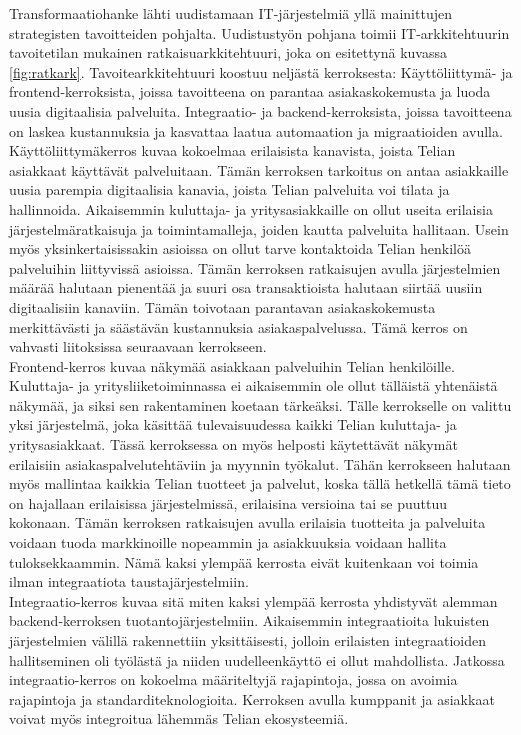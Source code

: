 \documentclass[finnish,12pt,a4paper,pdftex]{article}
\begin{document}
Transformaatiohanke lähti uudistamaan IT-järjestelmiä yllä mainittujen strategisten tavoitteiden pohjalta. Uudistustyön pohjana toimii IT-arkkitehtuurin tavoitetilan mukainen ratkaisuarkkitehtuuri, joka on esitettynä kuvassa \ref{fig:ratkark}. Tavoitearkkitehtuuri koostuu neljästä kerroksesta: Käyttöliittymä- ja frontend-kerroksista, joissa tavoitteena on parantaa asiakaskokemusta ja luoda uusia digitaalisia palveluita. Integraatio- ja backend-kerroksista, joissa tavoitteena on laskea kustannuksia ja kasvattaa laatua automaation ja migraatioiden avulla.\\

Käyttöliittymäkerros kuvaa kokoelmaa erilaisista kanavista, joista Telian asiakkaat käyttävät palveluitaan. Tämän kerroksen tarkoitus on antaa asiakkaille uusia parempia digitaalisia kanavia, joista Telian palveluita voi tilata ja hallinnoida. Aikaisemmin kuluttaja- ja yritysasiakkaille on ollut useita erilaisia järjestelmäratkaisuja ja toimintamalleja, joiden kautta palveluita hallitaan. Usein myös yksinkertaisissakin asioissa on ollut tarve kontaktoida Telian henkilöä palveluihin liittyvissä asioissa. Tämän kerroksen ratkaisujen avulla järjestelmien määrää halutaan pienentää ja suuri osa transaktioista halutaan siirtää uusiin digitaalisiin kanaviin. Tämän toivotaan parantavan asiakaskokemusta merkittävästi ja säästävän kustannuksia asiakaspalvelussa. Tämä kerros on vahvasti liitoksissa seuraavaan kerrokseen.\\

Frontend-kerros kuvaa näkymää asiakkaan palveluihin Telian henkilöille. Kuluttaja- ja yritysliiketoiminnassa ei aikaisemmin ole ollut tälläistä yhtenäistä näkymää, ja siksi sen rakentaminen koetaan tärkeäksi. Tälle kerrokselle on valittu yksi järjestelmä, joka käsittää tulevaisuudessa kaikki Telian kuluttaja- ja yritysasiakkaat. Tässä kerroksessa on myös helposti käytettävät näkymät erilaisiin asiakaspalvelutehtäviin ja myynnin työkalut. Tähän kerrokseen halutaan myös mallintaa kaikkia Telian tuotteet ja palvelut, koska tällä hetkellä tämä tieto on hajallaan erilaisissa järjestelmissä, erilaisina versioina tai se puuttuu kokonaan. Tämän kerroksen ratkaisujen avulla erilaisia tuotteita ja palveluita voidaan tuoda markkinoille nopeammin ja asiakkuuksia voidaan hallita tuloksekkaammin. Nämä kaksi ylempää kerrosta eivät kuitenkaan voi toimia ilman integraatiota taustajärjestelmiin.\\

Integraatio-kerros kuvaa sitä miten kaksi ylempää kerrosta yhdistyvät alemman backend-kerroksen tuotantojärjestelmiin. Aikaisemmin integraatioita lukuisten järjestelmien välillä rakennettiin yksittäisesti, jolloin erilaisten integraatioiden hallitseminen oli työlästä ja niiden uudelleenkäyttö ei ollut mahdollista. Jatkossa integraatio-kerros on kokoelma määriteltyjä rajapintoja, jossa on avoimia rajapintoja ja standarditeknologioita. Kerroksen avulla kumppanit ja asiakkaat voivat myös integroitua lähemmäs Telian ekosysteemiä. \\
\end{document}
